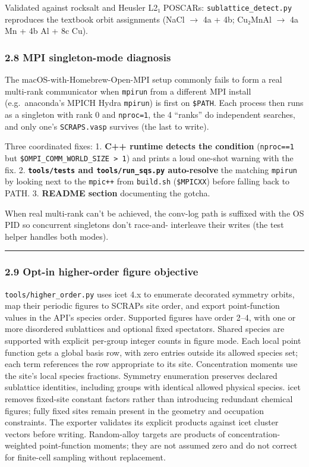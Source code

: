 \documentclass[
  11pt,
]{article}
\begin{document}
Validated against rocksalt and Heusler L2₁ POSCARs:
\texttt{sublattice\_detect.py} reproduces the textbook orbit assignments
(NaCl \(\to\) 4a + 4b; Cu₂MnAl \(\to\) 4a Mn + 4b Al + 8c Cu).

\subsubsection{2.8 MPI singleton-mode
diagnosis}\label{mpi-singleton-mode-diagnosis}

The macOS-with-Homebrew-Open-MPI setup commonly fails to form a real
multi-rank communicator when \texttt{mpirun} from a different MPI
install (e.g.~anaconda's MPICH Hydra \texttt{mpirun}) is first on
\texttt{\$PATH}. Each process then runs as a singleton with rank 0 and
\texttt{nproc=1}, the 4 ``ranks'' do independent searches, and only
one's \texttt{SCRAPS.vasp} survives (the last to write).

Three coordinated fixes: 1. \textbf{C++ runtime detects the condition}
(\texttt{nproc==1} but
\texttt{\$OMPI\_COMM\_WORLD\_SIZE\ \textgreater{}\ 1}) and prints a loud
one-shot warning with the fix. 2. \textbf{\texttt{tools/tests} and
\texttt{tools/run\_sqs.py} auto-resolve} the matching \texttt{mpirun} by
looking next to the \texttt{mpic++} from \texttt{build.sh}
(\texttt{\$MPICXX}) before falling back to PATH. 3. \textbf{README
section} documenting the gotcha.

When real multi-rank can't be achieved, the conv-log path is suffixed
with the OS PID so concurrent singletons don't race-and- interleave
their writes (the test helper handles both modes).

\begin{center}\rule{0.5\linewidth}{0.5pt}\end{center}

\subsubsection{2.9 Opt-in higher-order figure
objective}\label{opt-in-higher-order-figure-objective}

\texttt{tools/higher\_order.py} uses icet 4.x to enumerate decorated
symmetry orbits, map their periodic figures to SCRAPs site order, and
export point-function values in the API's species order. Supported
figures have order 2--4, with one or more disordered sublattices and
optional fixed spectators. Shared species are supported with explicit
per-group integer counts in figure mode. Each local point function gets
a global basis row, with zero entries outside its allowed species set;
each term references the row appropriate to its site. Concentration
moments use the site's local species fractions. Symmetry enumeration
preserves declared sublattice identities, including groups with
identical allowed physical species. icet removes fixed-site constant
factors rather than introducing redundant chemical figures; fully fixed
sites remain present in the geometry and occupation constraints. The
exporter validates its explicit products against icet cluster vectors
before writing. Random-alloy targets are products of
concentration-weighted point-function moments; they are not assumed zero
and do not correct for finite-cell sampling without replacement.
\end{document}
